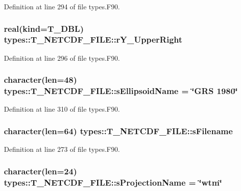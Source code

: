 Definition at line 294 of file types.F90.

\hypertarget{typetypes_1_1_t___n_e_t_c_d_f___f_i_l_e_a96cb708cc219e3f383fa55c6b6b46c37}{
\subsubsection[{rY\_\-UpperRight}]{\setlength{\rightskip}{0pt plus 5cm}real(kind={\bf T\_\-DBL}) {\bf types::T\_\-NETCDF\_\-FILE::rY\_\-UpperRight}}}
\label{typetypes_1_1_t___n_e_t_c_d_f___f_i_l_e_a96cb708cc219e3f383fa55c6b6b46c37}


Definition at line 296 of file types.F90.

\hypertarget{typetypes_1_1_t___n_e_t_c_d_f___f_i_l_e_a2c4ffa327d4722e7d7650a33d5d05ed4}{
\subsubsection[{sEllipsoidName}]{\setlength{\rightskip}{0pt plus 5cm}character(len=48) {\bf types::T\_\-NETCDF\_\-FILE::sEllipsoidName} = \char`\"{}GRS 1980\char`\"{}}}
\label{typetypes_1_1_t___n_e_t_c_d_f___f_i_l_e_a2c4ffa327d4722e7d7650a33d5d05ed4}


Definition at line 310 of file types.F90.

\hypertarget{typetypes_1_1_t___n_e_t_c_d_f___f_i_l_e_a9bc3dc2731c4ba68f3c3b48300708d4b}{
\subsubsection[{sFilename}]{\setlength{\rightskip}{0pt plus 5cm}character(len=64) {\bf types::T\_\-NETCDF\_\-FILE::sFilename}}}
\label{typetypes_1_1_t___n_e_t_c_d_f___f_i_l_e_a9bc3dc2731c4ba68f3c3b48300708d4b}


Definition at line 273 of file types.F90.

\hypertarget{typetypes_1_1_t___n_e_t_c_d_f___f_i_l_e_a06334fa90a138c43e3faf006c12760a3}{
\subsubsection[{sProjectionName}]{\setlength{\rightskip}{0pt plus 5cm}character(len=24) {\bf types::T\_\-NETCDF\_\-FILE::sProjectionName} = \char`\"{}wtm\char`\"{}}}
\label{typetypes_1_1_t___n_e_t_c_d_f___f_i_l_e_a06334fa90a138c43e3faf006c12760a3}


